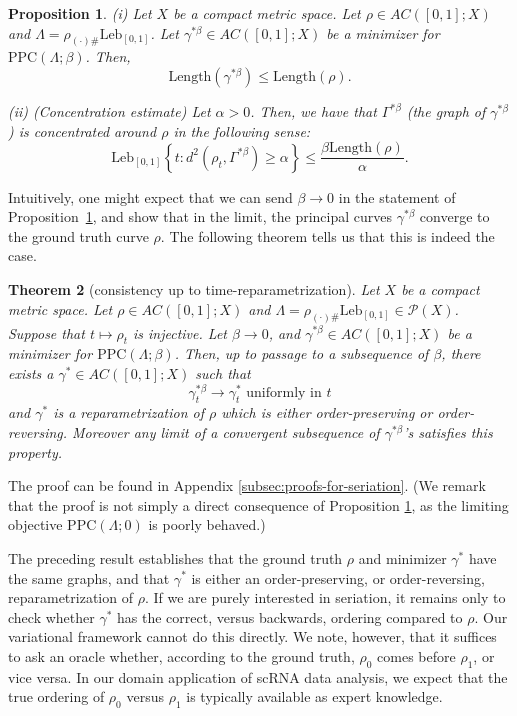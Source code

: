 \documentclass[aos, preprint]{imsart}
\theoremstyle{plain}
\newtheorem{theorem}{Theorem}[section]
\newtheorem{prop}[theorem]{Proposition}
\theoremstyle{remark}
\begin{document}
{\begin{prop}\label{prop:lengthbound-1d}
(i) Let $X$ be a compact metric space. Let $\rho\in AC([0,1];X)$
and $\Lambda=\rho_{(\cdot)\#}\text{Leb}_{[0,1]}$.
Let $\gamma^{*\beta}\in AC([0,1];X)$ be a minimizer for $\text{PPC}(\Lambda;\beta)$.
Then,
\[
\text{Length}(\gamma^{*\beta})\leq\text{Length}(\rho).
\]


(ii) (Concentration estimate) Let $\alpha>0$.
Then,
we have that $\Gamma^{*\beta}$ (the graph of $\gamma^{*\beta}$) is concentrated around $\rho$
in the following sense:
\[
\text{Leb}_{[0,1]}\left\{ t:d^{2}(\rho_{t},\Gamma^{*\beta})\geq\alpha\right\} \leq\frac{\beta\text{Length}(\rho)}{\alpha}.
\]
\end{prop}

Intuitively, one might expect that we can send $\beta\rightarrow 0$ in the statement of Proposition~\ref{prop:lengthbound-1d}, and show that in the limit, the principal curves $\gamma^{*\beta}$ converge to the ground truth curve $\rho$. The following theorem tells us that this is indeed the case.

\begin{theorem}[consistency up to time-reparametrization]
\label{thm:seriation-consistency}
Let $X$ be a compact metric
space. Let $\rho\in AC([0,1];X)$ and $\Lambda=\rho_{(\cdot)\#}\mathrm{Leb}_{[0,1]}\in\mathcal{P}(X)$.
Suppose that $t\mapsto\rho_{t}$ is injective. Let $\beta\rightarrow0$,  and
$\gamma^{*\beta}\in AC([0,1];X)$ be a minimizer for $\text{PPC}(\Lambda;\beta)$.
Then, up to passage to a subsequence of $\beta$, there exists
a $\gamma^*\in AC([0,1];X)$ such that
\[
\gamma_{t}^{*\beta}\rightarrow\gamma^*_{t}\text{ uniformly in }t
\]
and $\gamma^*$ is a reparametrization of $\rho$ which is either order-preserving or order-reversing. Moreover any  limit of a  convergent
subsequence of $\gamma^{*\beta}$'s  satisfies this property.

\end{theorem}

The proof can be found in Appendix \ref{subsec:proofs-for-seriation}. (We remark that the proof is not simply a direct consequence of Proposition \ref{prop:lengthbound-1d}, as the limiting objective $\textrm{PPC}(\Lambda;0)$ is poorly behaved.)


The preceding result establishes that the ground truth $\rho$ and
minimizer $\gamma^*$ have the same graphs, and that $\gamma^*$ is either an order-preserving, or order-reversing,
reparametrization of $\rho$. If we are purely interested in seriation, it remains only to check
whether $\gamma^*$ has the correct, versus backwards, ordering compared
to $\rho$. Our variational framework cannot do this directly.
We note, however, that it suffices to ask an oracle whether, according
to the ground truth, $\rho_0$ comes before $\rho_1$, or
vice versa. In our domain application of scRNA data analysis, we expect that the true ordering of $\rho_0$ versus $\rho_1$ is typically available as expert knowledge.

}
\end{document}
